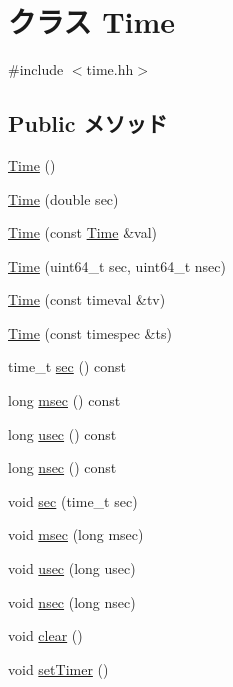 \hypertarget{classTime}{
\section{クラス Time}
\label{classTime}
}


{\ttfamily \#include $<$time.hh$>$}\subsection*{Public メソッド}
\begin{DoxyCompactItemize}
\item 
\hyperlink{classTime_a38b0285424ae98cbe324c635b300c750}{Time} ()
\item 
\hyperlink{classTime_aa42c586875ce57c957e701b206fef15f}{Time} (double sec)
\item 
\hyperlink{classTime_a4e61f2d79527b5f0d77f0ca3badfc395}{Time} (const \hyperlink{classTime}{Time} \&val)
\item 
\hyperlink{classTime_ae77dae7d6e62d188ba83f0e7db63cdd5}{Time} (uint64\_\-t sec, uint64\_\-t nsec)
\item 
\hyperlink{classTime_a781d0313688090b013c5879e43179fa7}{Time} (const timeval \&tv)
\item 
\hyperlink{classTime_a4f4f47ffb0388a0f536dbf23db1ae4d5}{Time} (const timespec \&ts)
\item 
time\_\-t \hyperlink{classTime_a423df492eb43ea2116185165099b5266}{sec} () const 
\item 
long \hyperlink{classTime_ae5ccea767592fcd6015b6a88de043382}{msec} () const 
\item 
long \hyperlink{classTime_a70d964ad0a91cc1ba79a20808c5139f7}{usec} () const 
\item 
long \hyperlink{classTime_a6688edbe52e72fa72a16651457dfc2b3}{nsec} () const 
\item 
void \hyperlink{classTime_aba2fa84032481bb1a61d605a23334811}{sec} (time\_\-t sec)
\item 
void \hyperlink{classTime_abe86a418b3cf42a34b2ad6327bcff7fb}{msec} (long msec)
\item 
void \hyperlink{classTime_ad6a6ca797b40a92e72ce85c8acc337a7}{usec} (long usec)
\item 
void \hyperlink{classTime_abf9aa5d6ba2a904a41528f39c0c91739}{nsec} (long nsec)
\item 
void \hyperlink{classTime_ac8bb3912a3ce86b15842e79d0b421204}{clear} ()
\item 
void \hyperlink{classTime_aaca92251d2a0c93c3ca57e75c8fd5e3c}{setTimer} ()

\end{DoxyCompactItemize}
